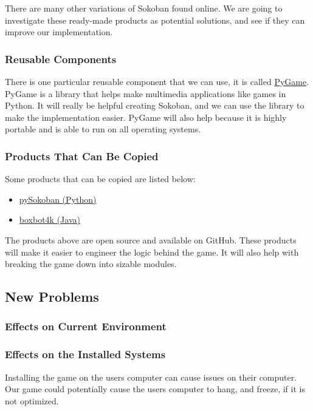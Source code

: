\documentclass[12pt, titlepage]{article}
\begin{document}
There are many other variations of Sokoban found online. We are going to investigate these ready-made products as potential solutions, and see if they can improve our implementation.

\subsubsection{Reusable Components}
There is one particular reusable component that we can use, it is called \href{https://www.pygame.org/news}{PyGame}. PyGame is a library that helps make multimedia applications like games in Python. It will really be helpful creating Sokoban, and we can use the library to make the implementation easier. PyGame will also help because it is highly portable and is able to run on all operating systems.

\subsubsection{Products That Can Be Copied}

Some products that can be copied are listed below:

\begin{itemize}
    \item \href{https://github.com/kazantzakis/pySokoban}{pySokoban (Python)}
    \item \href{https://github.com/gaborbata/boxbot4k}{boxbot4k (Java)}
\end{itemize}

The products above are open source and available on GitHub. These products will make it easier to engineer the logic behind the game. It will also help with breaking the game down into sizable modules.

\subsection{New Problems}
\subsubsection{Effects on Current Environment}

\subsubsection{Effects on the Installed Systems}

Installing the game on the users computer can cause issues on their computer. Our game could potentially cause the users computer to hang, and freeze, if it is not optimized.
\end{document}
